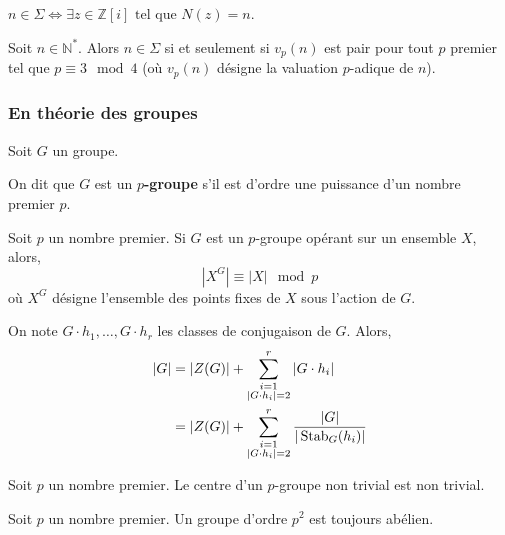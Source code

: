 	\begin{remark}
		$n \in \Sigma \iff \exists z \in \mathbb{Z}[i] \text{ tel que } N(z)=n$.
	\end{remark}
	
	\begin{theorem}
		Soit $n \in \mathbb{N}^*$. Alors $n \in \Sigma$ si et seulement si $v_p(n)$ est pair pour tout $p$ premier tel que $p \equiv 3 \mod 4$ (où $v_p(n)$ désigne la valuation $p$-adique de $n$).
	\end{theorem}
	
	\subsubsection{En théorie des groupes}
	
	
	Soit $G$ un groupe.
	
	\begin{definition}
		On dit que $G$ est un \textbf{$p$-groupe} s'il est d'ordre une puissance d'un nombre premier $p$.
	\end{definition}
	
	\begin{proposition}
		Soit $p$ un nombre premier. Si $G$ est un $p$-groupe opérant sur un ensemble $X$, alors,
		\[ |X^G| \equiv |X| \mod p \]
		où $X^G$ désigne l'ensemble des points fixes de $X$ sous l'action de $G$.
	\end{proposition}
	
	\begin{corollary}
		On note $G \cdot h_1, \dots, G \cdot h_r$ les classes de conjugaison de $G$. Alors,
		\begin{align*}
			\vert G \vert &= \vert Z(G) \vert + \sum_{\substack{i=1 \\ \vert G \cdot h_i \vert = 2}}^{r} \vert G \cdot h_i \vert \\
			&= \vert Z(G) \vert + \sum_{\substack{i=1 \\ \vert G \cdot h_i \vert = 2}}^{r} \frac{\vert G \vert}{\vert \operatorname{Stab}_G(h_i) \vert}
		\end{align*}
	\end{corollary}
	
	\begin{corollary}
		Soit $p$ un nombre premier. Le centre d'un $p$-groupe non trivial est non trivial.
	\end{corollary}
	
	\begin{corollary}
		Soit $p$ un nombre premier. Un groupe d'ordre $p^2$ est toujours abélien.
	\end{corollary}
	
